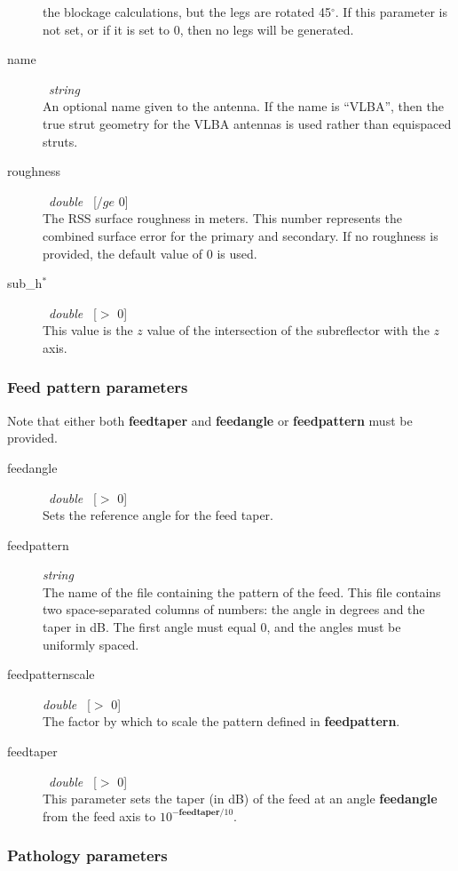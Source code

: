 \documentclass{article}
\begin{document}
\begin{description}
the blockage calculations, but the legs are rotated 45$^{\circ}$.  If this
parameter is not set, or if it is set to 0, then no legs will be generated.
\item[name] \ {\it string} \\
An optional name given to the antenna.  If the name is ``VLBA'', then
the true strut geometry for the VLBA antennas is used rather than 
equispaced struts.
\item[roughness] \ {\it double} \ [$/ge$ 0] \\
The RSS surface roughness in meters.  This number represents the combined
surface error for the primary and secondary.  If no roughness is provided,
the default value of 0 is used.
\item[sub\_h$^*$] \ {\it double} \ [$>$ 0] \\
This value is the $z$ value of the intersection of the subreflector with
the $z$ axis.
\end{description}

\subsubsection{Feed pattern parameters}

Note that either both {\bf feedtaper} and {\bf feedangle} or {\bf feedpattern}
must be provided.

\begin{description}
\item[feedangle] \ {\it double} \ [$>$ 0] \\
Sets the reference angle for the feed taper.
\item[feedpattern] {\it string} \\
The name of the file containing the pattern of the feed.  This file contains
two space-separated columns of numbers: the angle in degrees and the taper
in dB.  The first angle must equal 0, and the angles must be uniformly
spaced.
\item[feedpatternscale] {\it double} \ [$>$ 0] \\
The factor by which to scale the pattern defined in {\bf feedpattern}. 
\item[feedtaper] \ {\it double} \ [$>$ 0] \\
This parameter sets the taper (in dB) of the feed at an angle {\bf feedangle}
from the feed axis to $10^{-\mathbf{feedtaper}/10}$.
\end{description}

\subsubsection{Pathology parameters}
\end{document}
